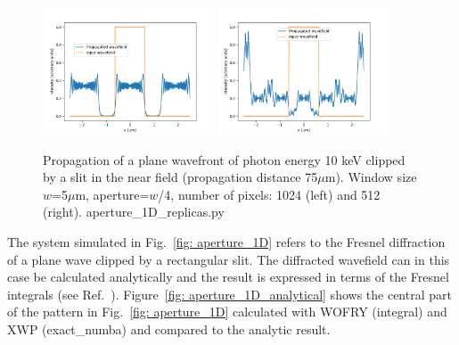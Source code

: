 \documentclass{iucr}              %
\newcommand{\inblue}[1]{{\color{blue}#1}}
\begin{document}
\begin{figure}
\label{fig: aperture_1D_replica}
\caption{Propagation of a plane wavefront of photon energy 10 keV clipped by a slit in the near field (propagation distance 75$\mu$m). Window size $w$=5$\mu$m, aperture=$w$/4, number of pixels: 1024 (left) and 512 (right). \inblue{aperture\_1D\_replicas.py}
}
\includegraphics[width=0.45\textwidth]{aperture_1D_over2.png}
\includegraphics[width=0.45\textwidth]{aperture_1D_over4.png}
\end{figure}


The system simulated in Fig.~\ref{fig: aperture_1D} refers to  the Fresnel diffraction of a plane wave clipped by a rectangular slit. The diffracted wavefield can in this case be calculated analytically and the result is expressed in terms of the Fresnel integrals (see Ref.~\cite{goodmanfourier}).  Figure~\ref{fig: aperture_1D_analytical} shows the central part of the pattern in Fig.~\ref{fig: aperture_1D} calculated with WOFRY (integral) and XWP (exact\_numba) and compared to the analytic result. 
\end{document}
